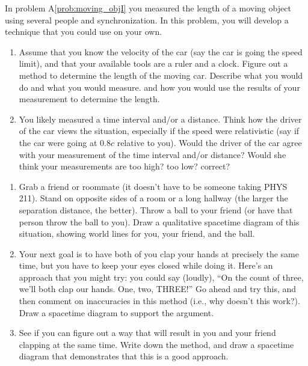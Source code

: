 \begin{exercise}
  In problem A\ref{prob:moving_objI} you measured the length of a
  moving object using several people and synchronization.  In this
  problem, you will develop a technique that you could use on your
  own.
  \begin{enumerate}
  \item Assume that you know the velocity of the car (say the car is
    going the speed limit), and that your available tools are a ruler
    and a clock.  Figure out a method to determine the length of the
    moving car.  Describe what you would do and what you would
    measure. and how you would use the results of your measurement to
    determine the length.

  \item You likely measured a time interval and/or a distance.  Think
    how the driver of the car views the situation, especially if the
    speed were relativistic (say if the car were going at $0.8c$
    relative to you).  Would the driver of the car agree with your
    measurement of the time interval and/or distance?  Would she think
    your measurements are too high?  too low?  correct?

  \end{enumerate}
\end{exercise}



\begin{exercise}
  \begin{enumerate}
  \item Grab a friend or roommate (it doesn't have to be someone
    taking PHYS 211).  Stand on opposite sides of a room or a long
    hallway (the larger the separation distance, the better).  Throw a
    ball to your friend (or have that person throw the ball to you).
    Draw a qualitative spacetime diagram of this situation, showing
    world lines for you, your friend, and the ball.

  \item Your next goal is to have both of you clap your hands at
    precisely the same time, but you have to keep your eyes closed
    while doing it.  Here's an approach that you might try: you could
    say (loudly), ``On the count of three, we'll both clap our hands.
    One, two, THREE!''  Go ahead and try this, and then comment on
    inaccuracies in this method (i.e., why doesn't this work?).  Draw
    a spacetime diagram to support the argument.

  \item See if you can figure out a way that will result in you and
    your friend clapping at the same time.  Write down the method, and
    draw a spacetime diagram that demonstrates that this is a good
    approach.
  \end{enumerate}
\label{prob:synchronizeA}
\end{exercise}


